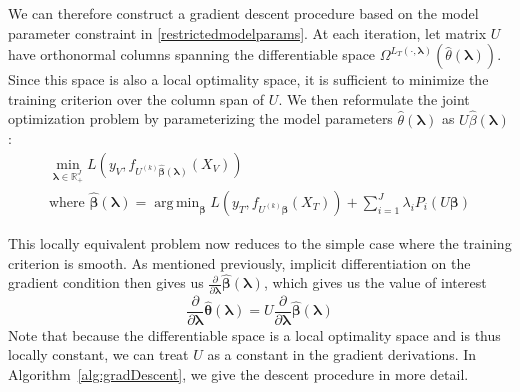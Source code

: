 \documentclass[10pt,letterpaper]{article}
\DeclareMathOperator*{\argmin}{arg\,min}
\begin{document}
We can therefore construct a gradient descent procedure based on the model parameter constraint in \eqref{restrictedmodelparams}. At each iteration, let matrix $U$ have orthonormal columns spanning the differentiable space $\Omega^{L_T(\cdot, \boldsymbol{\lambda})}(\hat \theta(\boldsymbol{\lambda}))$. Since this space is also a local optimality space, it is sufficient to minimize the training criterion over the column span of $U$. We then reformulate the joint optimization problem by parameterizing the model parameters $\hat \theta(\boldsymbol{\lambda})$ as $U \hat \beta(\boldsymbol{\lambda})$:
\begin{equation}
\begin{array}{c}
\min_{\boldsymbol \lambda \in \mathbb{R}_{+}^{J}} L(y_V, f_{U^{(k)} \hat{\boldsymbol \beta} (\boldsymbol \lambda) }(X_V)) \\
\text{where } \hat{\boldsymbol \beta} (\boldsymbol \lambda) =
\argmin_{\boldsymbol \beta}
L(y_T, f_{U^{(k)} \boldsymbol \beta}(X_T))
+ \sum\limits_{i=1}^J \lambda_i P_i( U \boldsymbol \beta)
\end{array}
\end{equation}

This locally equivalent problem now reduces to the simple case where the training criterion is smooth. As mentioned previously, implicit differentiation on the gradient condition then gives us $\frac{\partial}{\partial \boldsymbol \lambda}\hat{\boldsymbol \beta}(\boldsymbol \lambda)$, which gives us the value of interest
\begin{equation}
\frac{\partial}{\partial \boldsymbol \lambda}\hat{\boldsymbol \theta}(\boldsymbol \lambda) = U \frac{\partial}{\partial \boldsymbol \lambda}\hat{\boldsymbol \beta}(\boldsymbol \lambda)
\end{equation}
Note that because the differentiable space is a local optimality space and is thus locally constant, we can treat $U$ as a constant in the gradient derivations. In Algorithm~\ref{alg:gradDescent}, we give the descent procedure in more detail.
\end{document}
